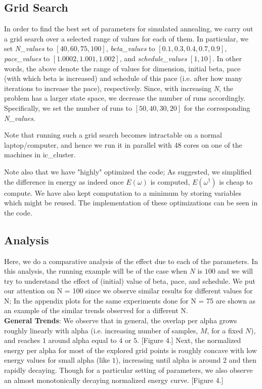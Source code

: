 \documentclass[a4paper]{article}
\begin{document}
\subsection{Grid Search}
In order to find the best set of parameters for simulated annealing, we carry out a grid search over a selected range of values for each of them. In particular, we set \textit{N\_values} to $[40, 60, 75, 100]$, \textit{beta\_values} to $[0.1, 0.3, 0.4, 0.7, 0.9]$, \textit{pace\_values} to $[1.0002, 1.001, 1.002]$, and \textit{schedule\_values} $[1, 10]$. In other words, the above denote the range of values for dimension, initial beta, pace (with which beta is increased) and schedule of this pace (i.e. after how many iterations to increase the pace), respectively. Since, with increasing \textit{N}, the problem has a larger state space, we decrease the number of runs accordingly. Specifically, we set the number of runs to $[50, 40, 30, 20]$ for the corresponding \textit{N\_values}.

Note that running such a grid search becomes intractable on a normal laptop/computer, and hence we run it in parallel with 48 cores on one of the machines in ic\_cluster.

Note also that we have "highly" optimized the code; As suggested, we simplified the difference in energy as indeed once $E(\omega)$ is computed, $E(\omega^{\dagger})$ is cheap to compute. We have also kept computation to a minimum by storing variables which might be reused. The implementation of these optimizations can be seen in the code.

\subsection{Analysis}
Here, we do a comparative analysis of the effect due to each of the parameters. In this analysis, the running example will be of the case when $N$ is $100$ and we will try to understand the effect of (initial) value of beta, pace, and schedule. We put our attention on N = 100 since we observe similar results for different values for N; In the appendix plots for the same experiments done for N = 75 are shown as an example of the similar trends observed for a different N.\\

\textbf{General Trends}: We observe that in general, the overlap per alpha grows roughly linearly with alpha (i.e. increasing number of samples, $M$, for a fixed $N$), and reaches $1$ around alpha equal to $4$ or $5$. [Figure 4.] Next, the normalized energy per alpha for most of the explored grid points is roughly concave with low energy values for small alpha (like $1$), increasing until alpha is around 2 and then rapidly decaying. Though for a particular setting of parameters, we also observe an almost monotonically decaying normalized energy curve. [Figure 4.] \\
\end{document}
